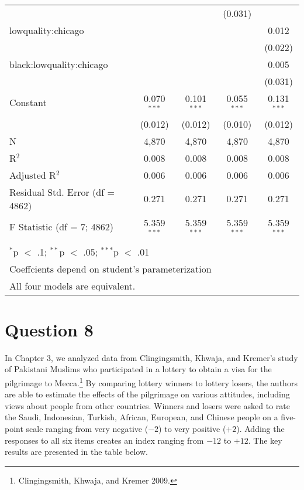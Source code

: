 \documentclass[11pt,notitlepage]{article}\usepackage[]{graphicx}\usepackage[]{color}
\begin{document}
\begin{enumerate}[a)]
\begin{table}[!htbp]
\begin{tabular}{@{\extracolsep{5pt}}lcccc}
  &  &  & (0.031) &  \\ 
  lowquality:chicago &  &  &  & 0.012 \\ 
  &  &  &  & (0.022) \\ 
  black:lowquality:chicago &  &  &  & 0.005 \\ 
  &  &  &  & (0.031) \\ 
  Constant & 0.070$^{***}$ & 0.101$^{***}$ & 0.055$^{***}$ & 0.131$^{***}$ \\ 
  & (0.012) & (0.012) & (0.010) & (0.012) \\ 
 N & 4,870 & 4,870 & 4,870 & 4,870 \\ 
R$^{2}$ & 0.008 & 0.008 & 0.008 & 0.008 \\ 
Adjusted R$^{2}$ & 0.006 & 0.006 & 0.006 & 0.006 \\ 
Residual Std. Error (df = 4862) & 0.271 & 0.271 & 0.271 & 0.271 \\ 
F Statistic (df = 7; 4862) & 5.359$^{***}$ & 5.359$^{***}$ & 5.359$^{***}$ & 5.359$^{***}$ \\ 
\hline \\[-1.8ex] 
\multicolumn{5}{l}{$^{*}$p $<$ .1; $^{**}$p $<$ .05; $^{***}$p $<$ .01} \\ 
\multicolumn{5}{l}{Coeffcients depend on student's parameterization} \\ 
\multicolumn{5}{l}{All four models are equivalent.} \\ 
\end{tabular} 
\end{table} 

\end{enumerate}

\section*{Question 8}
In Chapter 3, we analyzed data from Clingingsmith, Khwaja, and Kremer's study of Pakistani Muslims who participated in a lottery to obtain a visa for the pilgrimage to Mecca.\footnote{Clingingsmith, Khwaja, and Kremer 2009.} By comparing lottery winners to lottery losers, the authors are able to estimate the effects of the pilgrimage on various attitudes, including views about people from other countries. Winners and losers were asked to rate the Saudi, Indonesian, Turkish, African, European, and Chinese people on a five-point scale ranging from very negative ($-2$) to very positive ($+2$). Adding the responses to all six items creates an index ranging from $-12$ to $+12$. The key results are presented in the table below.
\end{document}
